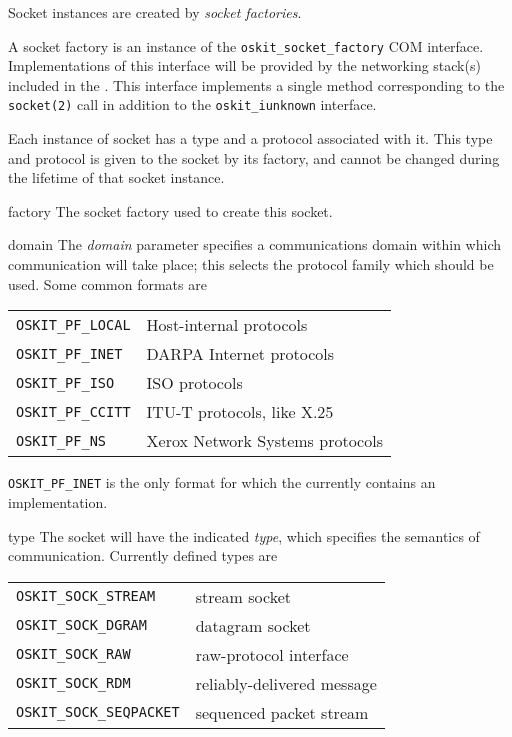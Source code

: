 \begin{apidesc}
    Socket instances are created by \emph{socket factories}. 

    A socket factory is an instance of the \texttt{oskit_socket_factory}
    COM interface.  Implementations of this interface will be provided
    by the networking stack(s) included in the \oskit{}.
    This interface implements a single method corresponding to the 
    \texttt{socket(2)} call in addition to the \texttt{oskit_iunknown}
    interface.

    Each instance of socket has a type and a protocol associated with it. 
    This type and protocol is given to the socket by its factory, and
    cannot be changed during the lifetime of that socket instance.
\end{apidesc}

\begin{apiparm}
	\item[factory] The socket factory used to create this socket.

	\item[domain] The \emph{domain} parameter specifies a communications
	domain within which communication will take place; 
	this selects the protocol family which should be used.
	Some common formats are

	\begin{tabular}{ll}
	\texttt{OSKIT_PF_LOCAL}     &   
		Host-internal protocols \\
	\texttt{OSKIT_PF_INET} 	   &
		DARPA Internet protocols \\
	\texttt{OSKIT_PF_ISO}       &   
		ISO protocols \\
	\texttt{OSKIT_PF_CCITT}     &   
		ITU-T protocols, like X.25 \\
	\texttt{OSKIT_PF_NS}        &   
		Xerox Network Systems protocols \\
	\end{tabular}

	\texttt{OSKIT_PF_INET} is the only format for 
	    which the \oskit{} currently contains an implementation.

	\item[type] The socket will have the indicated \emph{type}, which
	specifies the semantics of communication.  Currently defined types are

	\begin{tabular}{ll}
	\texttt{OSKIT_SOCK_STREAM}    &       stream socket \\
	\texttt{OSKIT_SOCK_DGRAM}     &       datagram socket \\
	\texttt{OSKIT_SOCK_RAW}       &       raw-protocol interface \\
	\texttt{OSKIT_SOCK_RDM}       &       reliably-delivered message \\
	\texttt{OSKIT_SOCK_SEQPACKET} &       sequenced packet stream \\
	\end{tabular}


\end{apiparm}
